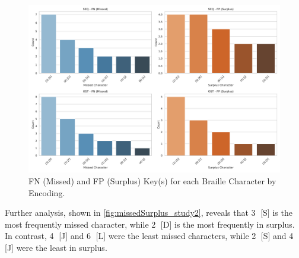 \begin{figure}
    \centering
    \includegraphics[width=\linewidth]{src/pictures/Study2Data_Experiment/missed_surplus_test_study2.pdf}
    \caption{FN (Missed) and FP (Surplus) Key(s) for each Braille Character by Encoding.}
    \label{fig:missedSurplus_study2}
\end{figure}

Further analysis, shown in \autoref{fig:missedSurplus_study2}, reveals that \textcircled{3} [S] is the most frequently missed character, while \textcircled{2} [D] is the most frequently in surplus. In contrast, \textcircled{4} [J] and \textcircled{6} [L] were the least missed characters, while \textcircled{2} [S] and \textcircled{4} [J] were the least in surplus.

